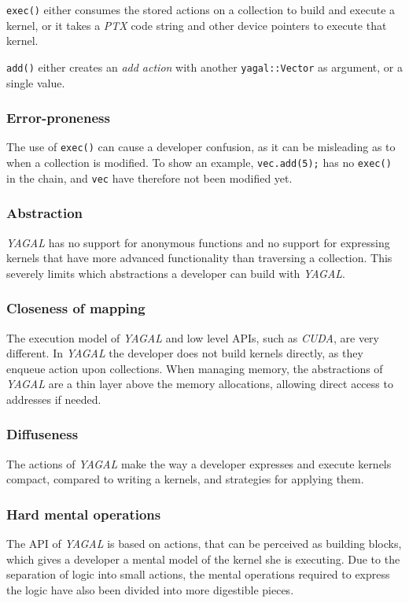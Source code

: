 \texttt{exec()} either consumes the stored actions on a collection to build and execute a kernel, or it takes a \textit{PTX} code string and other device pointers to execute that kernel.

\texttt{add()} either creates an \textit{add action} with another \texttt{yagal::Vector} as argument, or a single value.

\subsubsection[*]{Error-proneness}
The use of \texttt{exec()} can cause a developer confusion, as it can be misleading as to when a collection is modified. To show an example,
\texttt{vec.add(5);} has no \texttt{exec()} in the chain, and \texttt{vec} have therefore not been modified yet.

\subsubsection[*]{Abstraction}
\textit{YAGAL} has no support for anonymous functions and no support for expressing kernels that have more advanced functionality than traversing a collection. This severely limits which abstractions a developer can build with \textit{YAGAL}.

\subsubsection[*]{Closeness of mapping}
The execution model of \textit{YAGAL} and low level APIs, such as \textit{CUDA}, are very different. In \textit{YAGAL} the developer does not build kernels directly, as they enqueue action upon collections. When managing memory, the abstractions of \textit{YAGAL} are a thin layer above the memory allocations, allowing direct access to addresses if needed.

\subsubsection[*]{Diffuseness}
The actions of \textit{YAGAL} make the way a developer expresses and execute kernels compact, compared to writing a kernels, and strategies for applying them.

\subsubsection[*]{Hard mental operations}
The API of \textit{YAGAL} is based on actions, that can be perceived as building blocks, which gives a developer a mental model of the kernel she is executing. Due to the separation of logic into small actions, the mental operations required to express the logic have also been divided into more digestible pieces.

